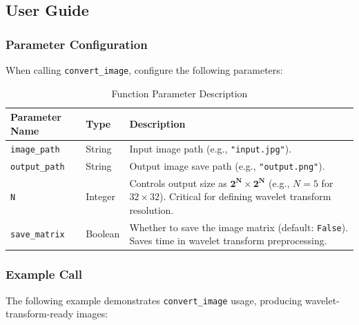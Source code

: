 \documentclass{article}
\theoremstyle{definition} %
\begin{document}
\subsection{User Guide}
\subsubsection{Parameter Configuration}
When calling \texttt{convert\_image}, configure the following parameters:

\begin{table}[ht]
    \centering
    \begin{tabular}{|>{\arraybackslash}p{2.5cm}|>{\arraybackslash}p{2cm}|>{\arraybackslash}p{7.5cm}|}
        \hline
        \textbf{Parameter Name} & \textbf{Type} & \textbf{Description}                                                                                                                            \\
        \hline
        \texttt{image\_path}    & String        & Input image path (e.g., \texttt{"input.jpg"}).                                                                                                  \\
        \hline
        \texttt{output\_path}   & String        & Output image save path (e.g., \texttt{"output.png"}).                                                                                           \\
        \hline
        \texttt{N}              & Integer       & Controls output size as \(\mathbf{2^N \times 2^N}\) (e.g., \(N = 5\) for \(32 \times 32\)). Critical for defining wavelet transform resolution. \\
        \hline
        \texttt{save\_matrix}   & Boolean       & Whether to save the image matrix (default: \texttt{False}). Saves time in wavelet transform preprocessing.                                      \\
        \hline
    \end{tabular}
    \caption{Function Parameter Description}
\end{table}

\subsubsection{Example Call}
The following example demonstrates \texttt{convert\_image} usage, producing wavelet-transform-ready images:

\end{document}
